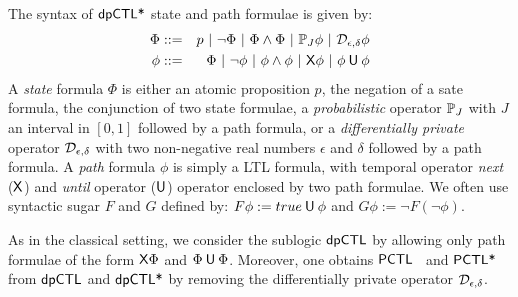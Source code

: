 
The syntax of $\textsf{dpCTL*}$ state and path formulae is given by:
\begin{eqnarray*}
  \Phi & ::= & p \ |\ \neg \Phi \ |\ \Phi \wedge \Phi \ |\
               \PJ{J} \phi \ |\ \dpriv{\epsilon}{\delta} \phi\\
  \phi & ::= & \Phi \ |\ \neg\phi  \ |\  \phi\wedge\phi  \ |\  \X \phi \ |\ \phi \until \phi
\end{eqnarray*}
A \emph{state} formula $\Phi$ is either  an atomic proposition
$p$, the negation of a sate formula, the conjunction of two state
formulae, a \emph{probabilistic} operator $\mathbb{P}_{J}$ with $J$
an interval in $[0, 1]$ followed by a path formula, or a
\emph{differentially private} operator $\mathcal{D}_{{\epsilon}, {\delta}}$
 with two non-negative real numbers $\epsilon$ and $\delta$ followed
 by a path formula. A
\emph{path} formula $\phi$ is simply a LTL formula, with temporal operator \emph{next}  ($\mathsf{X}$)
and  \emph{until} operator
($\mathbin{\mathsf{U}}$) operator enclosed by two path formulae.
We often use syntactic sugar $F$ and $G$ defined by: $F \phi:= true \mathbin{\mathsf{U}} \phi$ and $G\phi :=\neg F (\neg\phi)$.

As in the classical setting, we consider the sublogic $\textsf{dpCTL}$ by allowing only path formulae of the form $\mathsf{X}\Phi$ and $\Phi\mathbin{\mathsf{U}}\Phi$.
Moreover, one obtains $\textsf{PCTL}$~\cite{HanssonJ94} and $\textsf{PCTL*}$~\cite{BiancoA95} from $\textsf{dpCTL}$ and $\textsf{dpCTL*}$
by removing the differentially private operator  $\mathcal{D}_{{\epsilon}, {\delta}}$.

